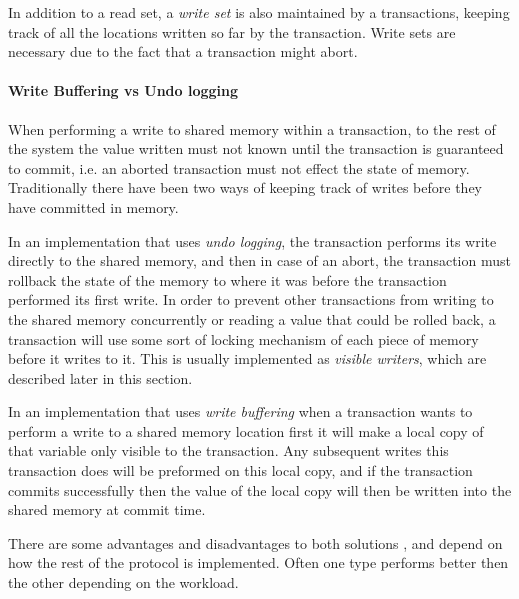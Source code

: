 In addition to a read set, a \emph{write set} is also maintained by a transactions, keeping track of all the locations
written so far by the transaction.
Write sets are necessary due to the fact that a transaction might abort.

\paragraph{Write Buffering vs Undo logging}
When performing a write to shared memory within a transaction, to the rest of  the system the value
 written must not known until the transaction is guaranteed to commit,
i.e. an aborted transaction must not effect the state of memory.
Traditionally there have been two ways of keeping track of writes before they have committed in memory.

In an implementation that uses \emph{undo logging},
the transaction performs its write
 directly to the shared memory, and then in case of an abort, the transaction must
 rollback the state of the memory to where it was before the transaction performed its first write.
In order to prevent other transactions from writing to the shared memory concurrently
 or reading a value that could be rolled back, a transaction will use some sort of locking mechanism of each piece of memory before it writes to it.
This is usually implemented as \emph{visible writers}, which are described later in this section.

In an implementation that uses \emph{write buffering}
when a transaction wants to perform
 a write to a shared memory location first it will make a local copy of that variable only visible to the transaction.
Any subsequent writes this transaction does will be preformed on this local copy,
 and if the transaction commits successfully then the value of the local copy will then be written into the shared memory at commit time.

There are some advantages and disadvantages to both solutions \cite{1123001}, and depend on how the rest of the 
protocol is implemented.
Often one type performs better then the other depending on the workload.



